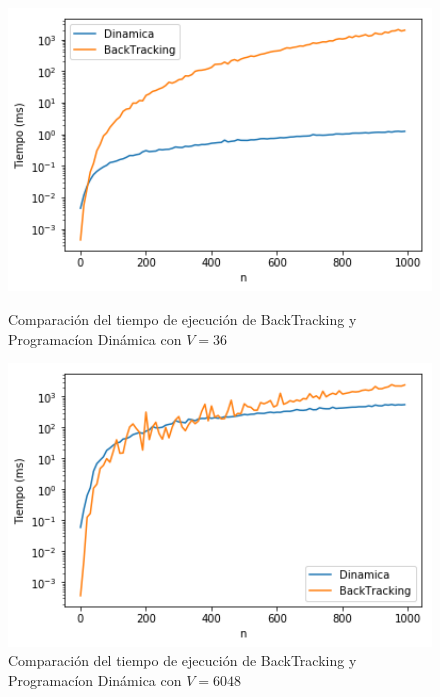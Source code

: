 \begin{figure}[H] 
    \centering
    \begin{minipage}{0.45\textwidth}
        \centering
        \includegraphics[width=1\textwidth]{img/tiempo/v/tiempoBackDinamicavChico.png} %
        \caption{Comparaci\'on del tiempo de ejecuci\'on de BackTracking y Programac\'ion Din\'amica con $V = 36$}
        \label{fig:tiempoBackDinamicavChico} 
    \end{minipage}\hfill
    \begin{minipage}{0.45\textwidth}
        \centering
        \includegraphics[width=1\textwidth]{img/tiempo/v/tiempoBackDinamicavGrande.png} %
        \caption{Comparaci\'on del tiempo de ejecuci\'on de BackTracking y Programac\'ion Din\'amica con $V = 6048$}
        \label{fig:tiempoBackDinamicavGrande} 
    \end{minipage}
\end{figure}

